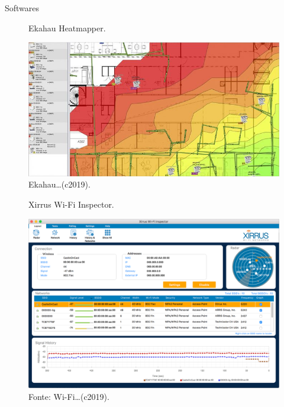 \documentclass[aspectratio=169,12pt]{beamer}
\begin{document}
\begin{frame}{Softwares}
	\noindent
	\begin{minipage}[c]{0.48\linewidth}
		\begin{figure}[H]
			\caption*{{\fontsize{9pt}{11}\selectfont Ekahau Heatmapper.}}
			\centering
			\includegraphics[scale=.29]{fig_tcc/heatmapper.jpg}
			\caption*{{\fontsize{9pt}{11}\selectfont Ekahau\ldots (c2019).}}
		\end{figure}
	\end{minipage}
	\hfill%
	\begin{minipage}[c]{.48\linewidth}
		\begin{figure}[H]
			\centering
			\caption*{{\fontsize{9pt}{11}\selectfont Xirrus Wi-Fi Inspector.}}
			\includegraphics[scale=0.133]{fig_tcc/xirrus.png}
			\caption*{{\fontsize{9pt}{11}\selectfont Fonte: Wi-Fi\ldots (c2019).}}
		\end{figure}
	\end{minipage}
\end{frame}
\end{document}

